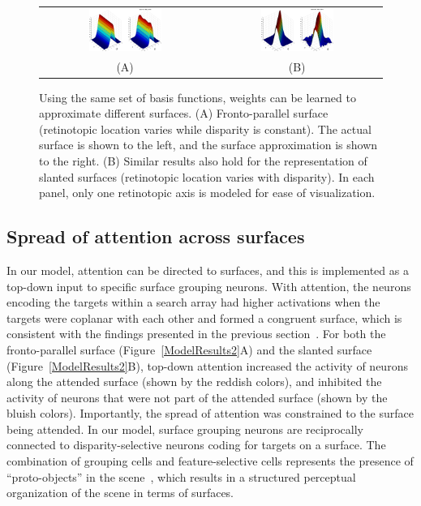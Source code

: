 \begin{figure}[t]
\centering
\begin{tabular}{c c}
\includegraphics[width=0.45\textwidth]{3D-Surface/figs/frontoparallel} &
\includegraphics[width=0.45\textwidth]{3D-Surface/figs/slanted}\\
(A) & (B)
\end{tabular}
\makeatletter
\let\@currsize\normalsize
\caption[Comparison of basis function approximation to true surfaces]{Using the same set of basis functions, weights can be learned to approximate different surfaces. (A) Fronto-parallel surface (retinotopic location varies while disparity is constant). The actual surface is shown to the left, and the surface approximation is shown to the right. (B) Similar results also hold for the representation of slanted surfaces (retinotopic location varies with disparity). In each panel, only one retinotopic axis is modeled for ease of visualization.}
\label{Surface_basisfunc}
\end{figure}

\subsection{Spread of attention across surfaces}

In our model, attention can be directed to surfaces, and this is implemented as a top-down input to specific surface grouping neurons. With attention, the neurons encoding the targets within a search array had higher activations when the targets were coplanar with each other and formed a congruent surface, which is consistent with the findings presented in the previous section~\citep{He_Nakayama95}. For both the fronto-parallel surface (Figure~\ref{ModelResults2}A) and the slanted surface (Figure~\ref{ModelResults2}B), top-down attention increased the activity of neurons along the attended surface (shown by the reddish colors), and inhibited the activity of neurons that were not part of the attended surface (shown by the bluish colors). Importantly, the spread of attention was constrained to the surface being attended. In our model, surface grouping neurons are reciprocally connected to disparity-selective neurons coding for targets on a surface. The combination of grouping cells and feature-selective cells represents the presence of ``proto-objects'' in the scene~\citep{Rensink00a}, which results in a structured perceptual organization of the scene in terms of surfaces.


